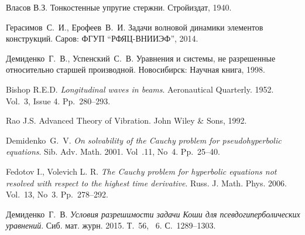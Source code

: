 \begin{thebibliography}{99}

Власов В.З. Тонкостенные упругие стержни. Стройиздат, 1940.

Герасимов~С.~И., Ерофеев~В.~И. Задачи волновой динамики элементов конструкций. Саров: ФГУП ``РФЯЦ-ВНИИЭФ'', 2014.

Демиденко~Г.~В., Успенский~С.~В. Уравнения и системы, не разрешенные относительно старшей производной. Новосибирск: Научная книга, 1998. 

Bishop R.E.D. {\it Longitudinal waves in beams}. Aeronautical Quarterly. 1952. Vol.~3, Issue 4. Pp.~280--293.

Rao J.S. Advanced Theory of Vibration. John Wiley \& Sons, 1992. 

Demidenko~G.~V. {\it On solvability of the Cauchy problem for pseudohyper\-bolic equations}. Sib. Adv. Math. 2001. Vol~.11, No~4. Pp.~25--40. 

Fedotov I., Volevich L. R. {\it The Cauchy problem for hyperbolic equations not resolved with respect to the highest time derivative}. Russ. J. Math. 
Phys. 2006. Vol.~13, No~3. Pp.~278--292.

Демиденко~Г.~В. {\it Условия разрешимости задачи Коши для псевдогиперболических уравнений}. Сиб. мат. журн. 
2015. Т.~56, \textnumero~6. С.~1289--1303. 


\end{thebibliography}





%

